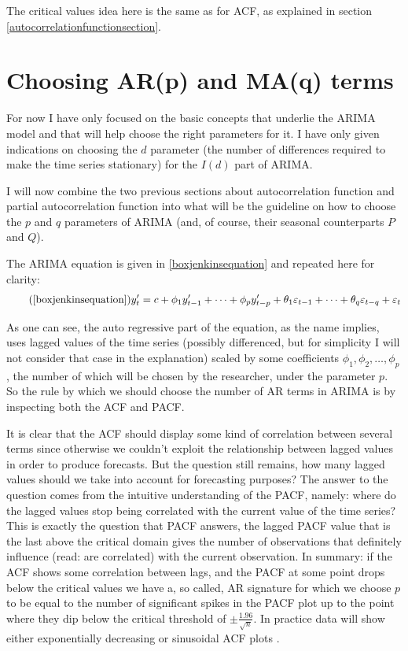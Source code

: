 \documentclass[12pt,a4paper,titlepage]{report}
\begin{document}
The critical values idea here is the same as for ACF, as explained in section \ref{autocorrelationfunctionsection}.

\section{Choosing AR(p) and MA(q) terms} \label{choosingarandmasection}

For now I have only focused on the basic concepts that underlie the ARIMA model and that will help choose the right parameters for it.  I have only given indications on choosing the $ d $ parameter (the number of differences required to make the time series stationary) for the $ I(d) $ part of ARIMA.

I will now combine the two previous sections about autocorrelation function and partial autocorrelation function into what will be the guideline on how to choose the $ p $ and $ q $ parameters of ARIMA (and, of course, their seasonal counterparts $ P $ and $ Q $).

The ARIMA equation is given in \ref{boxjenkinsequation} and repeated here for clarity:
\begin{equation}
\tag{\ref{boxjenkinsequation}}
y'_{t} = c + \phi_{1}y'_{t-1} + \cdots + \phi_{p}y'_{t-p} + \theta_{1}\varepsilon_{t-1} + \cdots + \theta_{q}\varepsilon_{t-q} + \varepsilon_{t}
\end{equation}

As one can see, the auto regressive part of the equation, as the name implies, uses lagged values of the time series (possibly differenced, but for simplicity I will not consider that case in the explanation) scaled by some coefficients $ \phi_{1}, \phi_{2}, \dots, \phi_{p} $, the number of which will be chosen by the researcher, under the parameter $ p $. So the rule by which we should choose the number of AR terms in ARIMA is by inspecting both the ACF and PACF. 

It is clear that the ACF should display some kind of correlation between several terms since otherwise we couldn't exploit the relationship between lagged values in order to produce forecasts. But the question still remains, how many lagged values should we take into account for forecasting purposes? The answer to the question comes from the intuitive understanding of the PACF, namely: where do the lagged values stop being correlated with the current value of the time series? This is exactly the question that PACF answers, the lagged PACF value that is the last above the critical domain gives the number of observations that definitely influence (read: are correlated) with the current observation. In summary: if the ACF shows some correlation between lags, and the PACF at some point drops below the critical values we have a, so called, AR signature for which we choose $ p $ to be equal to the number of significant spikes in the PACF plot up to the point where they dip below the critical threshold of $ \pm \frac{1.96}{\sqrt{n}} $. In practice data will show either exponentially decreasing or sinusoidal ACF plots \cite{fpp2nonseasonalarima}.
\end{document}
